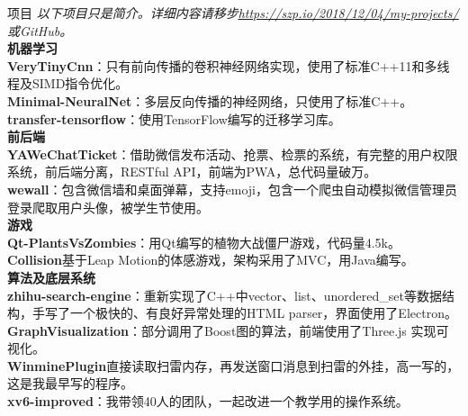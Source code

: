 \documentclass{resume}
\begin{document}
\begin{rSection}{项目}
\textit{以下项目只是简介。详细内容请移步\underline{\url{https://szp.io/2018/12/04/my-projects/}}或GitHub。}\\
\hspace*{-0.2in}\textbf{机器学习}\\
\textbf{VeryTinyCnn}：只有前向传播的卷积神经网络实现，使用了标准C++11和多线程及SIMD指令优化。\\
\textbf{Minimal-NeuralNet}：多层反向传播的神经网络，只使用了标准C++。\\
\textbf{transfer-tensorflow}：使用TensorFlow编写的迁移学习库。\\
\hspace*{-0.2in}\textbf{前后端}\\
\textbf{YAWeChatTicket}：借助微信发布活动、抢票、检票的系统，有完整的用户权限系统，前后端分离，RESTful API，前端为PWA，总代码量破万。\\
\textbf{wewall}：包含微信墙和桌面弹幕，支持emoji，包含一个爬虫自动模拟微信管理员登录爬取用户头像，被学生节使用。\\
\hspace*{-0.2in}\textbf{游戏}\\
\textbf{Qt-PlantsVsZombies}：用Qt编写的植物大战僵尸游戏，代码量4.5k。\\
\textbf{Collision}基于Leap Motion的体感游戏，架构采用了MVC，用Java编写。\\
\hspace*{-0.2in}\textbf{算法及底层系统}\\
\textbf{zhihu-search-engine}：重新实现了C++中vector、list、unordered\_set等数据结构，手写了一个极快的、有良好异常处理的HTML parser，界面使用了Electron。\\
\textbf{GraphVisualization}：部分调用了Boost图的算法，前端使用了Three.js 实现可视化。\\
\textbf{WinminePlugin}直接读取扫雷内存，再发送窗口消息到扫雷的外挂，高一写的，这是我最早写的程序。\\
\textbf{xv6-improved}：我带领40人的团队，一起改进一个教学用的操作系统。
\end{rSection}
\end{document}
